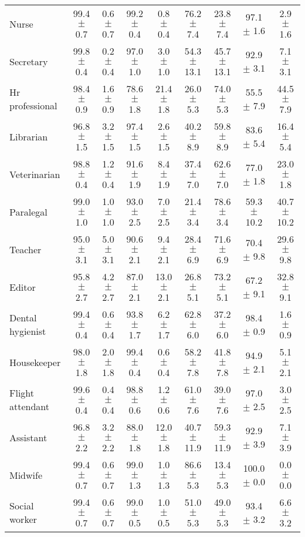 \begin{table*}[p]
{\begin{tabular}{l|cc|cc|cc|cc}
Nurse
& 99.4 $\pm$ 0.7 & 0.6 $\pm$ 0.7
& 99.2 $\pm$ 0.4 & 0.8 $\pm$ 0.4
& 76.2 $\pm$ 7.4 & 23.8 $\pm$ 7.4
& 97.1 $\pm$ 1.6 & 2.9 $\pm$ 1.6
\\
Secretary
& 99.8 $\pm$ 0.4 & 0.2 $\pm$ 0.4
& 97.0 $\pm$ 1.0 & 3.0 $\pm$ 1.0
& 54.3 $\pm$ 13.1 & 45.7 $\pm$ 13.1
& 92.9 $\pm$ 3.1 & 7.1 $\pm$ 3.1
\\
Hr professional
& 98.4 $\pm$ 0.9 & 1.6 $\pm$ 0.9
& 78.6 $\pm$ 1.8 & 21.4 $\pm$ 1.8
& 26.0 $\pm$ 5.3 & 74.0 $\pm$ 5.3
& 55.5 $\pm$ 7.9 & 44.5 $\pm$ 7.9
\\
Librarian
& 96.8 $\pm$ 1.5 & 3.2 $\pm$ 1.5
& 97.4 $\pm$ 1.5 & 2.6 $\pm$ 1.5
& 40.2 $\pm$ 8.9 & 59.8 $\pm$ 8.9
& 83.6 $\pm$ 5.4 & 16.4 $\pm$ 5.4
\\
Veterinarian
& 98.8 $\pm$ 0.4 & 1.2 $\pm$ 0.4
& 91.6 $\pm$ 1.9 & 8.4 $\pm$ 1.9
& 37.4 $\pm$ 7.0 & 62.6 $\pm$ 7.0
& 77.0 $\pm$ 1.8 & 23.0 $\pm$ 1.8
\\
Paralegal
& 99.0 $\pm$ 1.0 & 1.0 $\pm$ 1.0
& 93.0 $\pm$ 2.5 & 7.0 $\pm$ 2.5
& 21.4 $\pm$ 3.4 & 78.6 $\pm$ 3.4
& 59.3 $\pm$ 10.2 & 40.7 $\pm$ 10.2
\\
Teacher
& 95.0 $\pm$ 3.1 & 5.0 $\pm$ 3.1
& 90.6 $\pm$ 2.1 & 9.4 $\pm$ 2.1
& 28.4 $\pm$ 6.9 & 71.6 $\pm$ 6.9
& 70.4 $\pm$ 9.8 & 29.6 $\pm$ 9.8
\\
Editor
& 95.8 $\pm$ 2.7 & 4.2 $\pm$ 2.7
& 87.0 $\pm$ 2.1 & 13.0 $\pm$ 2.1
& 26.8 $\pm$ 5.1 & 73.2 $\pm$ 5.1
& 67.2 $\pm$ 9.1 & 32.8 $\pm$ 9.1
\\
Dental hygienist
& 99.4 $\pm$ 0.4 & 0.6 $\pm$ 0.4
& 93.8 $\pm$ 1.7 & 6.2 $\pm$ 1.7
& 62.8 $\pm$ 6.0 & 37.2 $\pm$ 6.0
& 98.4 $\pm$ 0.9 & 1.6 $\pm$ 0.9
\\
Housekeeper
& 98.0 $\pm$ 1.8 & 2.0 $\pm$ 1.8
& 99.4 $\pm$ 0.4 & 0.6 $\pm$ 0.4
& 58.2 $\pm$ 7.8 & 41.8 $\pm$ 7.8
& 94.9 $\pm$ 2.1 & 5.1 $\pm$ 2.1
\\
Flight attendant
& 99.6 $\pm$ 0.4 & 0.4 $\pm$ 0.4
& 98.8 $\pm$ 0.6 & 1.2 $\pm$ 0.6
& 61.0 $\pm$ 7.6 & 39.0 $\pm$ 7.6
& 97.0 $\pm$ 2.5 & 3.0 $\pm$ 2.5
\\
Assistant
& 96.8 $\pm$ 2.2 & 3.2 $\pm$ 2.2
& 88.0 $\pm$ 1.8 & 12.0 $\pm$ 1.8
& 40.7 $\pm$ 11.9 & 59.3 $\pm$ 11.9
& 92.9 $\pm$ 3.9 & 7.1 $\pm$ 3.9
\\
Midwife
& 99.4 $\pm$ 0.7 & 0.6 $\pm$ 0.7
& 99.0 $\pm$ 1.3 & 1.0 $\pm$ 1.3
& 86.6 $\pm$ 5.3 & 13.4 $\pm$ 5.3
& 100.0 $\pm$ 0.0 & 0.0 $\pm$ 0.0
\\
Social worker
& 99.4 $\pm$ 0.7 & 0.6 $\pm$ 0.7
& 99.0 $\pm$ 0.5 & 1.0 $\pm$ 0.5
& 51.0 $\pm$ 5.3 & 49.0 $\pm$ 5.3
& 93.4 $\pm$ 3.2 & 6.6 $\pm$ 3.2
\\

\end{tabular}}
\end{table*}
